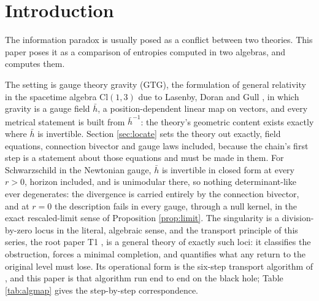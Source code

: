 \documentclass[11pt]{article}
\theoremstyle{definition}
\newcommand{\Cl}{\mathrm{Cl}}
\newcommand{\hb}{\bar{h}}
\begin{document}
\newpage
\section{Introduction}\label{sec:intro}

The information paradox is usually posed as a conflict between two theories. This paper poses it as a comparison of entropies computed in two algebras, and computes them.

The setting is gauge theory gravity (GTG), the formulation of general relativity in the spacetime algebra $\Cl(1,3)$ due to Lasenby, Doran and Gull \cite{LDG1998}, in which gravity is a gauge field $\hb$, a position-dependent linear map on vectors, and every metrical statement is built from $\hb^{-1}$: the theory's geometric content exists exactly where $\hb$ is invertible. Section \ref{sec:locate} sets the theory out exactly, field equations, connection bivector and gauge laws included, because the chain's first step is a statement about those equations and must be made in them. For Schwarzschild in the Newtonian gauge, $\hb$ is invertible in closed form at every $r > 0$, horizon included, and is unimodular there, so nothing determinant-like ever degenerates: the divergence is carried entirely by the connection bivector, and at $r = 0$ the description fails in every gauge, through a null kernel, in the exact rescaled-limit sense of Proposition \ref{prop:limit}. The singularity is a division-by-zero locus in the literal, algebraic sense, and the transport principle of this series, the root paper T1 \cite{ButlerT1}, is a general theory of exactly such loci: it classifies the obstruction, forces a minimal completion, and quantifies what any return to the original level must lose. Its operational form is the six-step transport algorithm of \cite[\S 8.1, Table 1]{ButlerT1}, and this paper is that algorithm run end to end on the black hole; Table \ref{tab:algmap} gives the step-by-step correspondence.
\end{document}
